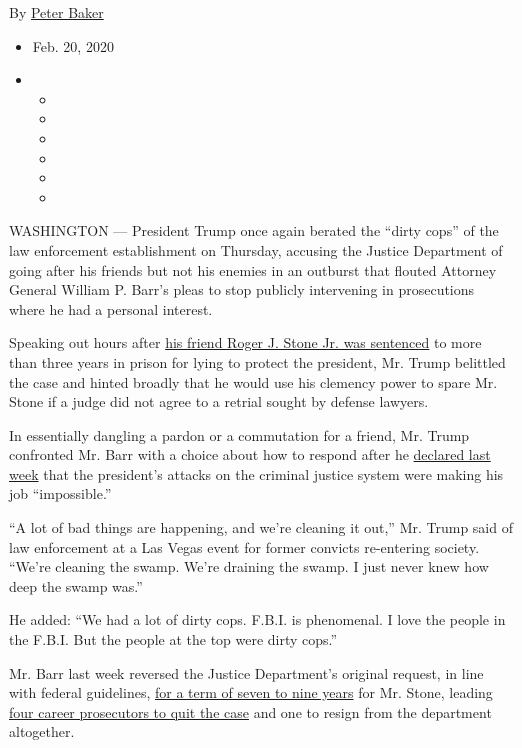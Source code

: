 By \href{https://www.nytimes3xbfgragh.onion/by/peter-baker}{Peter Baker}

\begin{itemize}
\item
  Feb. 20, 2020
\item
  \begin{itemize}
  \item
  \item
  \item
  \item
  \item
  \item
  \end{itemize}
\end{itemize}

WASHINGTON --- President Trump once again berated the ``dirty cops'' of
the law enforcement establishment on Thursday, accusing the Justice
Department of going after his friends but not his enemies in an outburst
that flouted Attorney General William P. Barr's pleas to stop publicly
intervening in prosecutions where he had a personal interest.

Speaking out hours after
\href{https://www.nytimes3xbfgragh.onion/2020/02/20/us/roger-stone-40-months-sentencing-verdict.html?action=click\&module=Top\%20Stories\&pgtype=Homepage}{his
friend Roger J. Stone Jr. was sentenced} to more than three years in
prison for lying to protect the president, Mr. Trump belittled the case
and hinted broadly that he would use his clemency power to spare Mr.
Stone if a judge did not agree to a retrial sought by defense lawyers.

In essentially dangling a pardon or a commutation for a friend, Mr.
Trump confronted Mr. Barr with a choice about how to respond after he
\href{https://www.nytimes3xbfgragh.onion/2020/02/13/us/politics/william-barr-trump.html}{declared
last week} that the president's attacks on the criminal justice system
were making his job ``impossible.''

``A lot of bad things are happening, and we're cleaning it out,'' Mr.
Trump said of law enforcement at a Las Vegas event for former convicts
re-entering society. ``We're cleaning the swamp. We're draining the
swamp. I just never knew how deep the swamp was.''

He added: ``We had a lot of dirty cops. F.B.I. is phenomenal. I love the
people in the F.B.I. But the people at the top were dirty cops.''

Mr. Barr last week reversed the Justice Department's original request,
in line with federal guidelines,
\href{https://www.nytimes3xbfgragh.onion/2020/02/10/us/roger-stone-prison-sentence.html}{for
a term of seven to nine years} for Mr. Stone, leading
\href{https://www.nytimes3xbfgragh.onion/2020/02/11/us/politics/roger-stone-sentencing.html}{four
career prosecutors to quit the case} and one to resign from the
department altogether.

